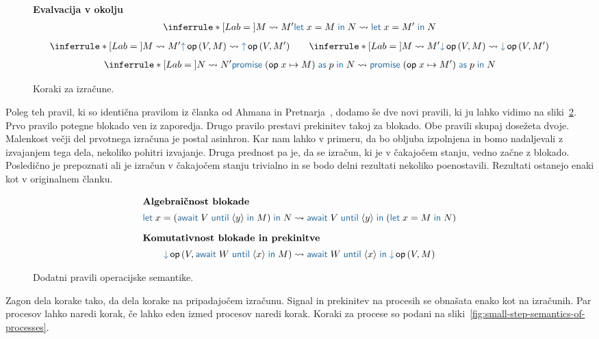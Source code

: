 \begin{figure}[H]
	\textbf{Evalvacija v okolju}
	\begin{align*}
	\coopinfer{}{
		M \reduces M'
	}{
		\tmlet{x}{M}{N} \reduces \tmlet{x}{M'}{N}
	}
	\end{align*}
\vspace{-4ex}
	\begin{align*}
	\coopinfer{}{
		M \reduces M'
	}{
		\tmopout{op}{V}{M} \reduces \tmopout{op}{V}{M'}
	}
	\qquad
	\coopinfer{}{
		M \reduces M'
	}{
		\tmopin{op}{V}{M} \reduces \tmopin{op}{V}{M'}
	}
	\end{align*}
\vspace{-4ex}
	\begin{align*}
	\coopinfer{}{
		N \reduces N'
	}{
		\tmwith{op}{x}{M}{p}{N} \reduces \tmwith{op}{x}{M'}{p}{N}
	}
	\end{align*}
	
	\caption{Koraki za izračune.}
	\label{fig:small-step-semantics-of-computations}
\end{figure}


Poleg teh pravil, ki so identična pravilom iz članka od Ahmana in Pretnarja~\cite{aeff}, dodamo še dve novi pravili, ki ju lahko vidimo na sliki~\ref{fig:operacijska-semantika-poenostavitev}.
Prvo pravilo potegne blokado ven iz zaporedja. Drugo pravilo prestavi prekinitev takoj za blokado. Obe pravili skupaj dosežeta dvoje. Malenkost večji del prvotnega izračuna je postal asinhron. Kar nam lahko v primeru, da bo obljuba izpolnjena in bomo nadaljevali z izvajanjem tega dela, nekoliko pohitri izvajanje. Druga prednost pa je, da se izračun, ki je v čakajočem stanju, vedno začne z blokado. Posledično je prepoznati ali je izračun v čakajočem stanju trivialno in se bodo delni rezultati nekoliko poenostavili. 
Rezultati ostanejo enaki kot v originalnem članku.


\begin{figure}[H]
	\centering
	\small
	\begin{align*}
		\intertext{\textbf{Algebraičnost blokade}}
		\tmlet{x}{(\tmawait{V}{y}{M})}{N} & \reduces \tmawait{V}{y}{(\tmlet{x}{M}{N})}
		\\[1ex]
		\intertext{\textbf{Komutativnost blokade in prekinitve}}
		\tmopin{op}{V}{\tmawait{W}{x}{M}} &\reduces \tmawait{W}{x}{\tmopin{op}{V}{M}}
	\end{align*}
	
	\caption{Dodatni pravili operacijske semantike.}
	\label{fig:operacijska-semantika-poenostavitev}
\end{figure}

Zagon dela korake tako, da dela korake na pripadajočem izračunu. Signal in prekinitev na procesih se obnašata enako kot na izračunih. Par procesov lahko naredi korak, če lahko eden izmed procesov naredi korak. Koraki za procese so podani na sliki~\ref{fig:small-step-semantics-of-processes}.

